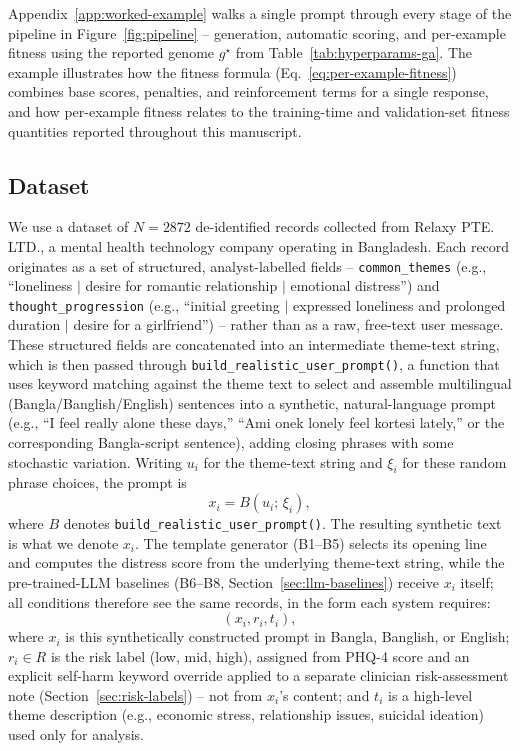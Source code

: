 \documentclass[mathematics,article,submit,xetex,moreauthors]{Definitions/mdpi}
\begin{document}
 Appendix~\ref{app:worked-example} walks a single
prompt through every stage of the pipeline in Figure~\ref{fig:pipeline} --
generation, automatic scoring, and per-example fitness using the reported
genome $g^{\star}$ from Table~\ref{tab:hyperparams-ga}. The example
illustrates how the fitness formula (Eq.~\eqref{eq:per-example-fitness})
combines base scores, penalties, and reinforcement terms for a single
response, and how per-example fitness relates to the training-time and
validation-set fitness quantities reported throughout this manuscript.

\subsection{Dataset}

We use a dataset of \(N = 2872\) de-identified records collected from Relaxy PTE. LTD.,
a mental health technology company operating in Bangladesh. Each record
originates as a set of structured, analyst-labelled fields --
\texttt{common\_themes} (e.g., ``loneliness $\vert$ desire for romantic
relationship $\vert$ emotional distress'') and \texttt{thought\_progression}
(e.g., ``initial greeting $\vert$ expressed loneliness and prolonged duration $\vert$ desire for a girlfriend'') -- rather than as a raw, free-text user message. These structured fields are concatenated into an intermediate theme-text string, which is then passed through \texttt{build\_realistic\_user\_prompt()}, a function that uses keyword matching against the theme text to select and assemble multilingual (Bangla/Banglish/English) sentences into a synthetic, natural-language prompt (e.g., ``I feel really alone these days,'' ``Ami onek lonely feel kortesi lately,'' or the corresponding Bangla-script sentence), adding closing phrases with some stochastic variation. 
Writing $u_i$ for the theme-text string and $\xi_i$ for these random phrase
choices, the prompt is
\begin{equation}
\label{eq:prompt-construction}
  x_i = B(u_i;\,\xi_i),
\end{equation}
where $B$ denotes \texttt{build\_realistic\_user\_prompt()}.
The resulting synthetic text is what we denote $x_i$. The template generator
(B1--B5) selects its opening line and computes the distress score from the
underlying theme-text string, while the pre-trained-LLM baselines (B6--B8,
Section~\ref{sec:llm-baselines}) receive $x_i$ itself; all conditions
therefore see the same records, in the form each system requires:
\begin{equation}
\label{eq:record}
  (x_i, r_i, t_i),
\end{equation}
where \(x_i\) is this synthetically constructed prompt in Bangla, Banglish,
or English;
\(r_i \in R\) is the risk label (low, mid, high), assigned from PHQ-4 score
and an explicit self-harm keyword override applied to a separate clinician
risk-assessment note (Section~\ref{sec:risk-labels}) -- not from $x_i$'s
content; and \(t_i\) is a high-level
theme description (e.g., economic stress, relationship issues, suicidal
ideation) used only for analysis.
\end{document}
